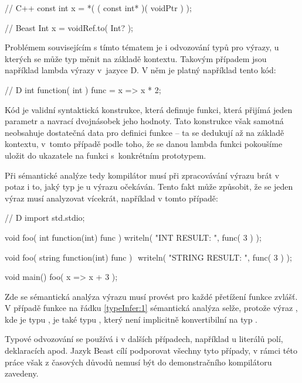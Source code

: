\begin{cppcode}
// C++
const int x = *( ( const int* )( voidPtr ) );
\end{cppcode}

\begin{code}
// Beast
Int x = voidRef.to( Int? );
\end{code}

Problémem souvisejícím s tímto tématem je i odvozování typů pro výrazy, u kterých se může typ měnit na základě kontextu. Takovým případem jsou například lambda výrazy v~jazyce D. V něm je platný například tento kód:

\begin{dcode}
// D
int function( int ) func = x => x * 2;
\end{dcode}

Kód  je validní syntaktická konstrukce, která definuje funkci, která přijímá jeden parametr a navrací dvojnásobek jeho hodnoty. Tato konstrukce však samotná neobsahuje dostatečná data pro definici funkce -- ta se dedukují až na základě kontextu, v~tomto případě podle toho, že se danou lambda funkci pokoušíme uložit do ukazatele na funkci s~konkrétním prototypem.

Při sémantické analýze tedy kompilátor musí při zpracovávání výrazu brát v potaz i to, jaký typ je u výrazu očekáván. Tento fakt může způsobit, že se jeden výraz musí analyzovat vícekrát, například v tomto případě:
\begin{dcode}
// D
import std.stdio;

void foo( int function(int) func ) {
	writeln( "INT RESULT: ", func( 3 ) );
}

void foo( string function(int) func ) { $\label{typeInfer:1}$
	writeln( "STRING RESULT: ", func( 3 ) );
}

void main() {
	foo( x => x + 3 );
}
\end{dcode}

Zde se sémantická analýza výrazu  musí provést pro každé přetížení funkce  zvlášť. V případě funkce na řádku \ref{typeInfer:1} sémantická analýza selže, protože výraz , kde  je typu , je také typu , který není implicitně konvertibilní na typ .

Typové odvozování se používá i v dalších případech, například u literálů polí,  deklaracích apod. Jazyk Beast cílí podporovat všechny tyto případy, v rámci této práce však z časových důvodů nemusí být do demonstračního kompilátoru zavedeny.

